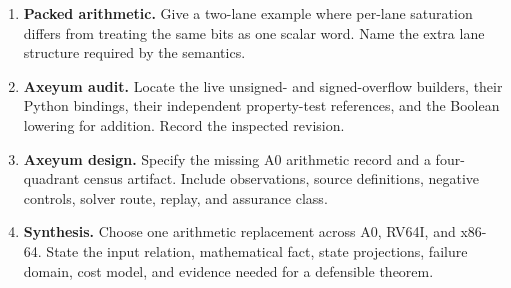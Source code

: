 \begin{enumerate}
\item \textbf{Packed arithmetic.} Give a two-lane example where per-lane
saturation differs from treating the same bits as one scalar word. Name the
extra lane structure required by the semantics.

\item \textbf{Axeyum audit.} Locate the live unsigned- and signed-overflow
builders, their Python bindings, their independent property-test references,
and the Boolean lowering for addition. Record the inspected revision.

\item \textbf{Axeyum design.} Specify the missing A0 arithmetic record and a
four-quadrant census artifact. Include observations, source definitions,
negative controls, solver route, replay, and assurance class.

\item \textbf{Synthesis.} Choose one arithmetic replacement across A0, RV64I,
and x86-64. State the input relation, mathematical fact, state projections,
failure domain, cost model, and evidence needed for a defensible theorem.
\end{enumerate}
